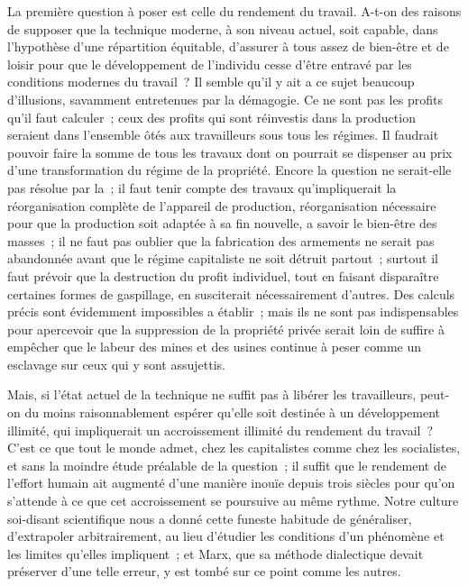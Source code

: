 \documentclass[french,twoside]{book} %
\begin{document}
La première question à poser est celle du rendement du travail. A-t-on des raisons de supposer que la technique moderne, à son niveau actuel, soit capable, dans l'hypothèse d'une répartition équitable, d'assurer à tous assez de bien-être et de loisir pour que le développement de l'individu cesse d'être entravé par les conditions modernes du travail ? Il semble qu'il y ait a ce sujet beaucoup d'illusions, savamment entretenues par la démagogie. Ce ne sont pas les profits qu'il faut calculer ; ceux des profits qui sont réinvestis dans la production seraient dans l'ensemble ôtés aux travailleurs sous tous les régimes. Il faudrait pouvoir faire la somme de tous les travaux dont on pourrait se dispenser au prix d'une transformation du régime de la propriété. Encore la question ne serait-elle pas résolue par la ; il faut tenir compte des travaux qu'impliquerait la réorganisation complète de l'appareil de production, réorganisation nécessaire pour que la production soit adaptée à sa fin nouvelle, a savoir le bien-être des masses ; il ne faut pas oublier que la fabrication des armements ne serait pas abandonnée avant que le régime capitaliste ne soit détruit partout ; surtout il faut prévoir que la destruction du profit individuel, tout en faisant disparaître certaines formes de gaspillage, en susciterait nécessairement d'autres. Des calculs précis sont évidemment impossibles a établir ; mais ils ne sont pas indispensables pour apercevoir que la suppression de la propriété privée serait loin de suffire à empêcher que le labeur des mines et des usines continue à peser comme un esclavage sur ceux qui y sont assujettis.\par
Mais, si l'état actuel de la technique ne suffit pas à libérer les travailleurs, peut-on du moins raisonnablement espérer qu'elle soit destinée à un développement illimité, qui impliquerait un accroissement illimité du rendement du travail ? C'est ce que tout le monde admet, chez les capitalistes comme chez les socialistes, et sans la moindre étude préalable de la question ; il suffit que le rendement de l'effort humain ait augmenté d'une manière inouïe depuis trois siècles pour qu'on s'attende à ce que cet accroissement se poursuive au même rythme. Notre culture soi-disant scientifique nous a donné cette funeste habitude de généraliser, d'extrapoler arbitrairement, au lieu d'étudier les conditions d'un phénomène et les limites qu'elles impliquent ; et Marx, que sa méthode dialectique devait préserver d'une telle erreur, y est tombé sur ce point comme les autres.\par
\end{document}
